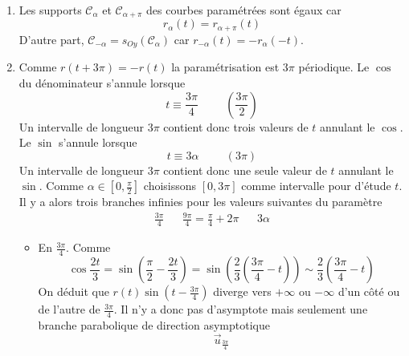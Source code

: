 \begin{enumerate}
\item  Les supports $\mathcal{C}_{\alpha }$ et $\mathcal{C}_{\alpha +\pi }$ des courbes param{\'e}tr{\'e}es sont {\'e}gaux car 
\begin{displaymath}
r_{\alpha}(t)=r_{\alpha +\pi }(t) 
\end{displaymath}
D'autre part, $\mathcal{C}_{-\alpha }=s_{Oy}(\mathcal{C}_{\alpha })$ car $r_{-\alpha }(t)=-r_{\alpha }(-t)$.

\item  Comme $r(t+3\pi )=-r(t)$ la param{\'e}trisation est $3\pi $ p{\'e}riodique.\newline
Le $\cos $ du d{\'e}nominateur s'annule lorsque 
\begin{displaymath}
 t\equiv \frac{3\pi }{4} \hspace{1cm} (\frac{3\pi }{2})
\end{displaymath}
Un intervalle de longueur $3\pi $ contient donc trois valeurs de $t$ annulant le $\cos $.\newline
Le $\sin $ s'annule lorsque 
\begin{displaymath}
 t\equiv 3\alpha \hspace{1cm} (3\pi)
\end{displaymath}
Un intervalle de longueur $3\pi $ contient donc une seule valeur de $t$ annulant le $\sin $.\newline
Comme $\alpha \in \left[ 0,\frac{\pi }{2}\right] $ choisissons $\left[ 0,3\pi\right] $ comme intervalle pour d'étude $t$. Il y a alors trois branches infinies pour les valeurs suivantes du paramètre
\begin{align*}
 \frac{3\pi }{4} & &
 \frac{9\pi }{4}=\frac{\pi}{4}+2\pi & &
3\alpha 
\end{align*}
\begin{itemize}
\item  En $\frac{3\pi }{4}$. Comme
\begin{displaymath}
 \cos \frac{2t}{3} = \sin (\frac{\pi }{2}-\frac{2t}{3})
 = \sin (\frac{2}{3}(\frac{3\pi }{4}-t))
 \sim \frac{2}{3}(\frac{3\pi }{4}-t)
\end{displaymath}
On d{\'e}duit que $r(t)\sin (t-\frac{3\pi }{4})$ diverge vers $+\infty $ ou $-\infty $ d'un c{\^o}t{\'e} ou de l'autre de $\frac{3\pi }{4}$.\newline
Il n'y a donc pas d'asymptote mais seulement une branche parabolique de direction asymptotique
\begin{displaymath}
 \overrightarrow{u}_{\frac{3\pi }{4}}
\end{displaymath}


\end{itemize}
\end{enumerate}

